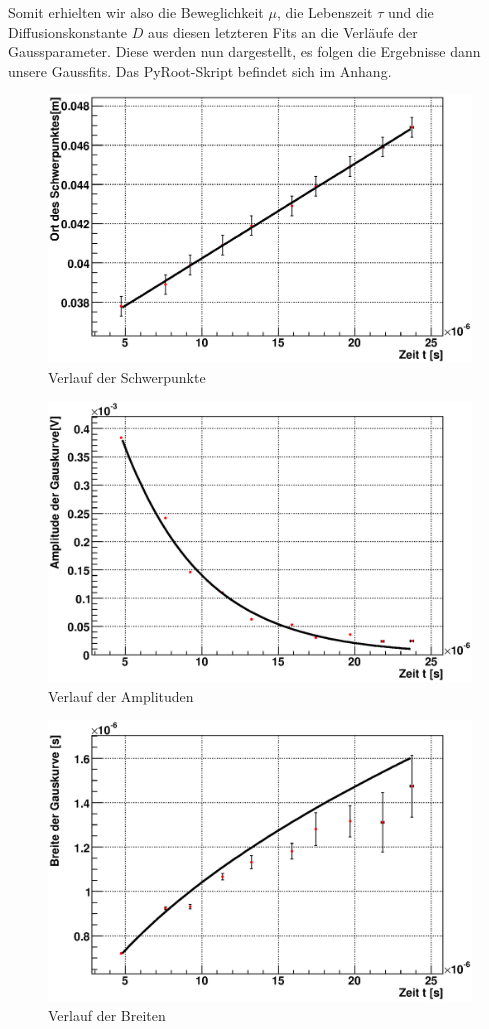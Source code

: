 \documentclass[12pt]{article}
\begin{document}
Somit erhielten wir also die Beweglichkeit $\mu$, die Lebenszeit $\tau$ und die Diffusionskonstante $D$ aus diesen letzteren Fits an die Verläufe der Gaussparameter. Diese werden nun dargestellt, es folgen die Ergebnisse dann unsere Gaussfits. Das PyRoot-Skript befindet sich im Anhang.


\begin{figure}[H]  
\includegraphics[width=0.9\linewidth]{pictures/varDist/Schwerpunkt.eps}
\caption{Verlauf der Schwerpunkte}
\end{figure}

\begin{figure}[H]  
\includegraphics[width=0.9\linewidth]{pictures/varDist/amplitude.eps}
\caption{Verlauf der Amplituden}
\end{figure}

\begin{figure}[H]  
\includegraphics[width=0.9\linewidth]{pictures/varDist/sigma.eps}
\caption{Verlauf der Breiten}
\end{figure}
\end{document}
